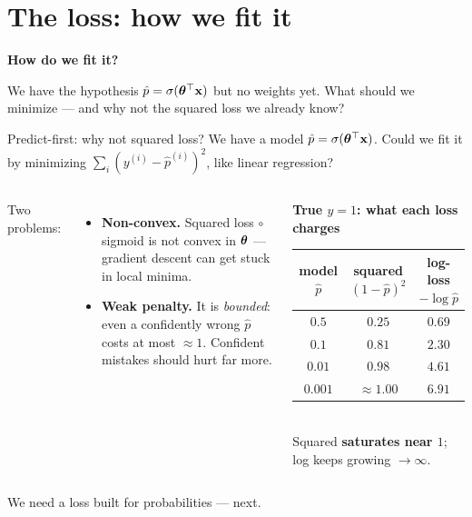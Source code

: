 \documentclass[aspectratio=169]{beamer}
\begin{document}
\section{The loss: how we fit it}

\begin{frame}[plain]
  \vfill
  \begin{center}
    {\Large\color{popblue}\textbf{How do we fit it?}}\\[0.9em]
    \begin{minipage}{0.82\textwidth}\centering\small
      We have the hypothesis $\hat p = \sigma(\bm{\theta}^\top \mathbf{x})$ but no weights yet. What should we
      minimize --- and why not the squared loss we already know?
    \end{minipage}
  \end{center}
  \vfill
\end{frame}

\begin{frame}{Predict-first: why not squared loss?}
  We have a model $\hat p = \sigma(\bm{\theta}^\top \mathbf{x})$. Could we fit it by minimizing
  $\sum_i (y^{(i)} - \hat p^{(i)})^2$, like linear regression?
  \begin{columns}[T]
    Two problems:
    \begin{itemize}\small
      \item \textbf{Non-convex.} Squared loss $\circ$ sigmoid is not convex in $\bm{\theta}$
        --- gradient descent can get stuck in local minima.
      \item \textbf{Weak penalty.} It is \emph{bounded}: even a confidently wrong $\hat p$
        costs at most $\approx 1$. Confident mistakes should hurt far more.
    \end{itemize}
    \begin{center}\scriptsize
    \textbf{True $y=1$: what each loss charges}\\[2pt]
    \renewcommand{\arraystretch}{1.25}
    \begin{tabular}{c c c}
      model $\hat p$ & squared $(1-\hat p)^2$ & log-loss $-\log\hat p$ \\
      \hline
      $0.5$ & $0.25$ & $0.69$ \\
      $0.1$ & $0.81$ & $2.30$ \\
      $0.01$ & $0.98$ & $\mathbf{4.61}$ \\
      $0.001$ & $\approx 1.00$ & $\mathbf{6.91}$ \\
      \hline
    \end{tabular}\\[3pt]
    Squared \textbf{saturates near $1$}; log keeps growing $\to \infty$.
    \end{center}
  \end{columns}
  \vfill
  \footnotesize We need a loss built for probabilities --- next.
\end{frame}
\end{document}

